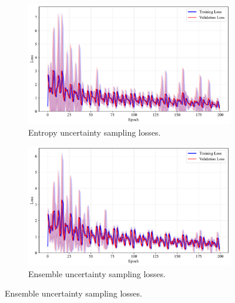 \documentclass[10pt, conference]{IEEEtran}
\begin{document}
\begin{figure}[!t]
	\begin{subfigure}{\linewidth}
		\centering
		\includegraphics[width=\linewidth]{../results/energy/us_losses.pdf}
		\caption{Entropy uncertainty sampling losses.}
		\label{fig:us_losses_energy}
	\end{subfigure}
	
	\vspace{0.1em}
	
	\begin{subfigure}{\linewidth}
		\centering
		\includegraphics[width=\linewidth]{../results/energy/ensemble_us_losses.pdf}
		\caption{Ensemble uncertainty sampling losses.}
		\label{fig:ensemble_us_losses_energy}
	\end{subfigure}
\end{figure}
\end{document}
